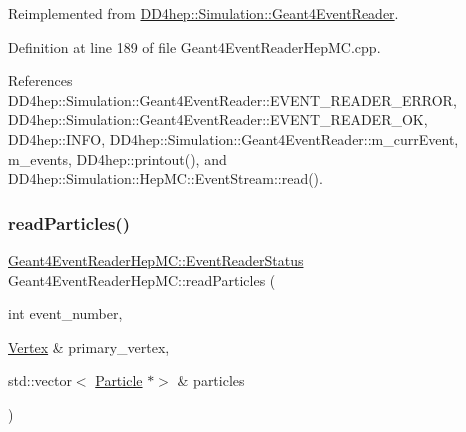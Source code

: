 Reimplemented from \hyperlink{class_d_d4hep_1_1_simulation_1_1_geant4_event_reader_a0b6d2fe12ae259534cbe7a5b6e35b642}{D\+D4hep\+::\+Simulation\+::\+Geant4\+Event\+Reader}.



Definition at line 189 of file Geant4\+Event\+Reader\+Hep\+M\+C.\+cpp.



References D\+D4hep\+::\+Simulation\+::\+Geant4\+Event\+Reader\+::\+E\+V\+E\+N\+T\+\_\+\+R\+E\+A\+D\+E\+R\+\_\+\+E\+R\+R\+OR, D\+D4hep\+::\+Simulation\+::\+Geant4\+Event\+Reader\+::\+E\+V\+E\+N\+T\+\_\+\+R\+E\+A\+D\+E\+R\+\_\+\+OK, D\+D4hep\+::\+I\+N\+FO, D\+D4hep\+::\+Simulation\+::\+Geant4\+Event\+Reader\+::m\+\_\+curr\+Event, m\+\_\+events, D\+D4hep\+::printout(), and D\+D4hep\+::\+Simulation\+::\+Hep\+M\+C\+::\+Event\+Stream\+::read().

\hypertarget{class_d_d4hep_1_1_simulation_1_1_geant4_event_reader_hep_m_c_ac2077360499585e272ced523412f025e}{}\label{class_d_d4hep_1_1_simulation_1_1_geant4_event_reader_hep_m_c_ac2077360499585e272ced523412f025e} 
\subsubsection{\texorpdfstring{read\+Particles()}{readParticles()}}
{\footnotesize\ttfamily \hyperlink{class_d_d4hep_1_1_simulation_1_1_geant4_event_reader_ae4f4bc83ffcf5b0c1868ad78859851e7}{Geant4\+Event\+Reader\+Hep\+M\+C\+::\+Event\+Reader\+Status} Geant4\+Event\+Reader\+Hep\+M\+C\+::read\+Particles (\begin{DoxyParamCaption}\item[{int}]{event\+\_\+number,  }\item[{\hyperlink{class_d_d4hep_1_1_simulation_1_1_geant4_event_reader_ac9738208fe520e5aa2ad1efa13de82e7}{Vertex} \&}]{primary\+\_\+vertex,  }\item[{std\+::vector$<$ \hyperlink{class_d_d4hep_1_1_simulation_1_1_geant4_event_reader_ad37f7aa722da2299517d66b4568a6a4a}{Particle} $\ast$$>$ \&}]{particles }\end{DoxyParamCaption})\hspace{0.3cm}{\ttfamily [virtual]}}



